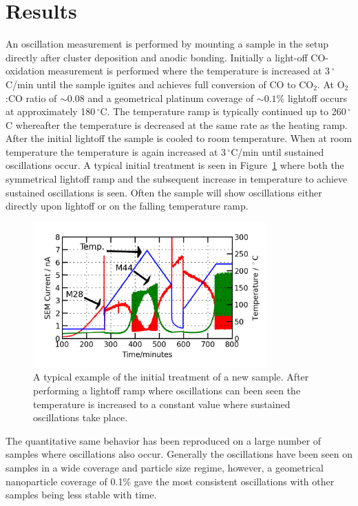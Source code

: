 \documentclass[8.5pt,twoside,twocolumn]{article}
\begin{document}
\section{Results}
An oscillation measurement is performed by mounting a sample in the setup directly after cluster deposition and anodic bonding. Initially a light-off CO-oxidation measurement is performed where the temperature is increased at 3\,$^\circ$C/min until the sample ignites and achieves full conversion of CO to CO$_2$. At O$_2$:CO ratio of $\sim0.08$ and a geometrical platinum coverage of $\sim0.1\%$ lightoff occurs at approximately 180\,$^\circ$C. The temperature ramp is typically continued up to 260\,$^\circ$C whereafter the temperature is decreased at the same rate as the heating ramp. After the initial lightoff the sample is cooled to room temperature. When at room temperature the temperature is again increased at 3\,$^\circ$C/min until sustained oscillations occur. A typical initial treatment is seen in Figure~\ref{fgr:initial_treatment} where both the symmetrical lightoff ramp and the subsequent increase in temperature to achieve sustained oscillations is seen. Often the sample will show oscillations either directly upon lightoff or on the falling temperature ramp.
\begin{figure}[h]
\centering
  \includegraphics[width=9cm]{initial_treatment.png}
  \caption{A typical example of the initial treatment of a new sample. After performing a lightoff ramp where oscillations can been seen the temperature is increased to a constant value where sustained oscillations take place.}
  \label{fgr:initial_treatment}
\end{figure}
The quantitative same behavior has been reproduced on a large number of samples where oscillations also occur. Generally the oscillations have been seen on samples in a wide coverage and particle size regime, however, a geometrical nanoparticle coverage of 0.1\% gave the most consistent oscillations with other samples being less stable with time.
\end{document}
